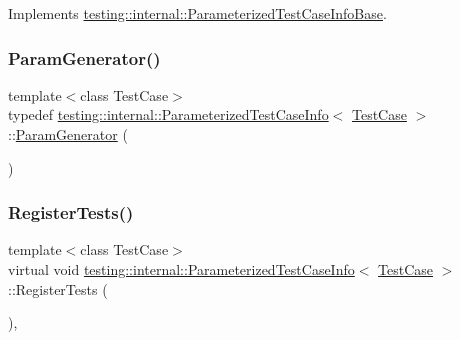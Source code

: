 Implements \mbox{\hyperlink{classtesting_1_1internal_1_1ParameterizedTestCaseInfoBase_a932b4a9185a72d5bdfa5fd84fc06cbca}{testing\+::internal\+::\+Parameterized\+Test\+Case\+Info\+Base}}.

\mbox{\label{classtesting_1_1internal_1_1ParameterizedTestCaseInfo_a2f6a423f7ae8c7ac24b468538693aa26}} 
\subsubsection{\texorpdfstring{ParamGenerator()}{ParamGenerator()}}
{\footnotesize\ttfamily template$<$class Test\+Case$>$ \\
typedef \mbox{\hyperlink{classtesting_1_1internal_1_1ParameterizedTestCaseInfo}{testing\+::internal\+::\+Parameterized\+Test\+Case\+Info}}$<$ \mbox{\hyperlink{classtesting_1_1TestCase}{Test\+Case}} $>$\+::\mbox{\hyperlink{classtesting_1_1internal_1_1ParamGenerator}{Param\+Generator}} (\begin{DoxyParamCaption}\item[{Generator\+Creation\+Func}]{ }\end{DoxyParamCaption})}

\mbox{\label{classtesting_1_1internal_1_1ParameterizedTestCaseInfo_a7e118820b3074ce70c0440e2e49a50a1}} 
\subsubsection{\texorpdfstring{RegisterTests()}{RegisterTests()}}
{\footnotesize\ttfamily template$<$class Test\+Case$>$ \\
virtual void \mbox{\hyperlink{classtesting_1_1internal_1_1ParameterizedTestCaseInfo}{testing\+::internal\+::\+Parameterized\+Test\+Case\+Info}}$<$ \mbox{\hyperlink{classtesting_1_1TestCase}{Test\+Case}} $>$\+::Register\+Tests (\begin{DoxyParamCaption}{ }\end{DoxyParamCaption})\hspace{0.3cm}{\ttfamily [inline]}, {\ttfamily [virtual]}}



